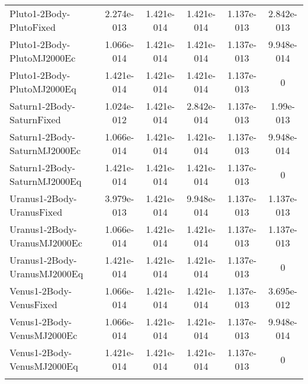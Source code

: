 \begin{table}[htbp!]
\begin{tabular}{lccccc}
         Pluto1-2Body-PlutoFixed & 2.274e-013 & 1.421e-014 & 1.421e-014 & 1.137e-013 & 2.842e-013 \\
         Pluto1-2Body-PlutoMJ2000Ec & 1.066e-014 & 1.421e-014 & 1.421e-014 & 1.137e-013 & 9.948e-014 \\
         Pluto1-2Body-PlutoMJ2000Eq & 1.421e-014 & 1.421e-014 & 1.421e-014 & 1.137e-013 & 0 \\
         Saturn1-2Body-SaturnFixed & 1.024e-012 & 1.421e-014 & 2.842e-014 & 1.137e-013 & 1.99e-013 \\
         Saturn1-2Body-SaturnMJ2000Ec & 1.066e-014 & 1.421e-014 & 1.421e-014 & 1.137e-013 & 9.948e-014 \\
         Saturn1-2Body-SaturnMJ2000Eq & 1.421e-014 & 1.421e-014 & 1.421e-014 & 1.137e-013 & 0 \\
         Uranus1-2Body-UranusFixed & 3.979e-013 & 1.421e-014 & 9.948e-014 & 1.137e-013 & 1.137e-013 \\
         Uranus1-2Body-UranusMJ2000Ec & 1.066e-014 & 1.421e-014 & 1.421e-014 & 1.137e-013 & 1.137e-013 \\
         Uranus1-2Body-UranusMJ2000Eq & 1.421e-014 & 1.421e-014 & 1.421e-014 & 1.137e-013 & 0 \\
         Venus1-2Body-VenusFixed & 1.066e-014 & 1.421e-014 & 1.421e-014 & 1.137e-013 & 3.695e-012 \\
         Venus1-2Body-VenusMJ2000Ec & 1.066e-014 & 1.421e-014 & 1.421e-014 & 1.137e-013 & 9.948e-014 \\
         Venus1-2Body-VenusMJ2000Eq & 1.421e-014 & 1.421e-014 & 1.421e-014 & 1.137e-013 & 0 \\
      \hline\hline
      \label{Table: WinGMAT-LinuxGMAT CS Parameters Set 5} 
\end{tabular}
\end{table}
